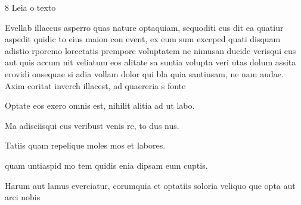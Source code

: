 \num{8} Leia o texto

Evellab illaccus asperro quas nature optaquiam, sequoditi cus dit ea quatiur
aspedit quidic to eius maion con event, ex eum sum exceped quati disquam
adistio rporemo lorectatis prempore voluptatem ne nimusan ducide verisqui
cus aut quis accum nit veliatum eos alitate sa suntia volupta veri utas dolum
assita erovidi onsequae si adia vollam dolor qui bla quia santiusam, ne nam
audae. Axim coritat inverch illacest, ad quaereria s
fonte

Optate eos exero omnis est, nihilit alitia ad ut labo.

\begin{escolha}
\item Ma adisciisqui cus veribust venis re, to dus nus.
\item Tatiis quam repelique moles mos et labores.
\item quam untiaspid mo tem quidis enia dipsam eum cuptis.
\item Harum aut lamus everciatur, corumquia et optatiis soloria veliquo que opta
aut arci nobis
\end{escolha}

\lipsum[1-20]